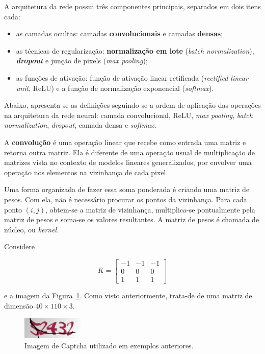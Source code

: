 \documentclass[12pt,twoside,brazilian]{book}
\providecommand{\tightlist}{%
  \setlength{\itemsep}{0pt}\setlength{\parskip}{0pt}}
\begin{document}
A arquitetura da rede possui três componentes principais, separados em
dois itens cada:

\begin{itemize}
\tightlist
\item
  as camadas ocultas: camadas \textbf{convolucionais} e camadas
  \textbf{densas};
\item
  as técnicas de regularização: \textbf{normalização em lote}
  (\emph{batch normalization}), \textbf{\emph{dropout}} e junção de
  pixels (\emph{max pooling});
\item
  as funções de ativação: função de ativação linear retificada
  (\emph{rectified linear unit}, ReLU) e a função de normalização
  exponencial (\emph{softmax}).
\end{itemize}

Abaixo, apresenta-se as definições seguindo-se a ordem de aplicação das
operações na arquitetura da rede neural: camada convolucional, ReLU,
\emph{max pooling}, \emph{batch normalization}, \emph{dropout}, camada
densa e \emph{softmax}.

A \textbf{convolução} é uma operação linear que recebe como entrada uma
matriz e retorna outra matriz. Ela é diferente de uma operação usual de
multiplicação de matrizes vista no contexto de modelos lineares
generalizados, por envolver uma operação nos elementos na vizinhança de
cada pixel.

Uma forma organizada de fazer essa soma ponderada é criando uma matriz
de pesos. Com ela, não é necessário procurar os pontos da vizinhança.
Para cada ponto \((i,j)\), obtem-se a matriz de vizinhança,
multiplica-se pontualmente pela matriz de pesos e soma-se os valores
resultantes. A matriz de pesos é chamada de núcleo, ou \emph{kernel}.

Considere

\[
K = \left[\begin{array}{rrr}-1&-1&-1\\0&0&0\\1&1&1\end{array}\right]
\]

e a imagem da Figura~\ref{fig-tjmg-exemplo-conv}. Como visto
anteriormente, trata-de de uma matriz de dimensão
\(40\times110\times3\).

\begin{figure}

{\centering \includegraphics[width=1.14583in,height=\textheight]{./assets/img/tjmg16283c1e6d06.jpeg}

}

\caption{\label{fig-tjmg-exemplo-conv}Imagem de Captcha utilizado em
exemplos anteriores.}

\end{figure}
\end{document}
